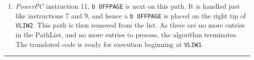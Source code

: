 \begin{small}
\begin{enumerate}
\item {\it PowerPC} instruction 11, {\tt b OFFPAGE} is next on this
path.  It is handled just like instructions 7 and 9, and hence a
{\tt b OFFPAGE} is placed on the right tip of {\tt VLIW2}.  This
path is then removed from the list.  As there are no more entries in
the PathList, and no more entries to process, the algorithm
terminates.  The translated code is ready for execution beginning at
{\tt VLIW1}.

\end{enumerate}
\end{small}

\vspace*{-0.15in}

\noindent\rule{6.79in}{1.00mm}


